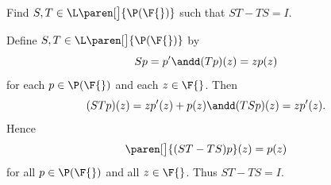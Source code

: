 \exercise
Find $S, T \in \L\paren[\big]{ \P(\F{}) }$ such that $ST - TS = I$.\label{9commutator}

\begin{Solution}
Define $S, T \in \L\paren[\big]{ \P(\F{}) }$ by
\[
Sp = p' \andd (Tp)(z) = z p(z)
\]
for each $p \in \P(\F{})$ and each $z \in \F{}$. Then
\[
(STp)(z) = z p'(z) + p(z) \andd (TSp)(z) = z p'(z).
\]
Hence
\[
\paren[\big]{(ST - TS)p}(z) = p(z)
\]
for all $p \in \P(\F{})$ and all $z \in \F{}$. Thus $ST - TS = I$.
\end{Solution}

